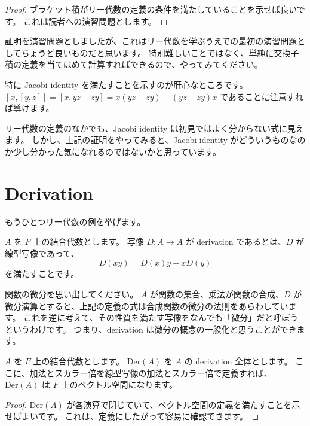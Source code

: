 \documentclass{ltjsarticle}
\begin{document}
\begin{proof}
    ブラケット積がリー代数の定義の条件を満たしていることを示せば良いです。
    これは読者への演習問題とします。
\end{proof}

証明を演習問題としましたが、これはリー代数を学ぶうえでの最初の演習問題としてちょうど良いものだと思います。
特別難しいことではなく、単純に交換子積の定義を当てはめて計算すればできるので、やってみてください。

特に Jacobi identity を満たすことを示すのが肝心なところです。
\([x, [y, z]] = [x, yz - zy] = x(yz - zy) - (yz - zy)x\) であることに注意すれば導けます。

リー代数の定義のなかでも、Jacobi identity は初見ではよく分からない式に見えます。
しかし、上記の証明をやってみると、Jacobi identity がどういうものなのか少し分かった気になれるのではないかと思っています。

\section{Derivation}

もうひとつリー代数の例を挙げます。

\begin{definition}[derivation]
    \(A\) を \(F\) 上の結合代数とします。
    写像 \(D : A \to A\) が derivation であるとは、\(D\) が線型写像であって、
    \[
        D(xy) = D(x)y + xD(y)
    \]
    を満たすことです。
\end{definition}

関数の微分を思い出してください。
\(A\) が関数の集合、乗法が関数の合成、\(D\) が微分演算とすると、上記の定義の式は合成関数の微分の法則をあらわしています。
これを逆に考えて、その性質を満たす写像をなんでも「微分」だと呼ぼうというわけです。
つまり、derivation は微分の概念の一般化と思うことができます。

\begin{proposition}
    \(A\) を \(F\) 上の結合代数とします。
    \(\mathrm{Der}(A)\) を \(A\) の derivation 全体とします。
    ここに、加法とスカラー倍を線型写像の加法とスカラー倍で定義すれば、
    \(\mathrm{Der}(A)\) は \(F\) 上のベクトル空間になります。
\end{proposition}

\begin{proof}
    \(\mathrm{Der}(A)\) が各演算で閉じていて、ベクトル空間の定義を満たすことを示せばよいです。
    これは、定義にしたがって容易に確認できます。
\end{proof}
\end{document}
